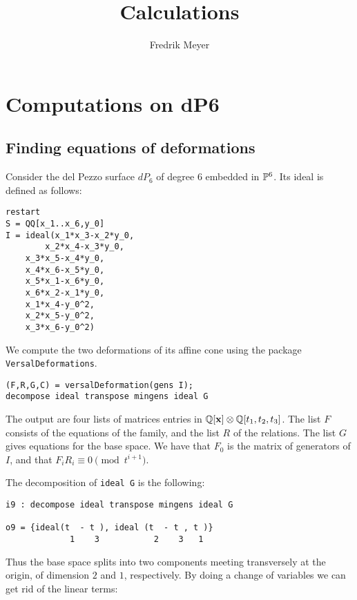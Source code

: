 \documentclass[11pt, english]{article}
\begin{document}
\title{Calculations}
\author{Fredrik Meyer}
\maketitle

\tableofcontents 

\section{Computations on dP6}
\subsection{Finding equations of deformations}

Consider the del Pezzo surface $dP_6$ of degree 6 embedded in $\mathbb{P}^6$. Its ideal is defined as follows:

\begin{lstlisting}
restart
S = QQ[x_1..x_6,y_0]
I = ideal(x_1*x_3-x_2*y_0,
    	x_2*x_4-x_3*y_0,
	x_3*x_5-x_4*y_0,
	x_4*x_6-x_5*y_0,
	x_5*x_1-x_6*y_0,
	x_6*x_2-x_1*y_0,
	x_1*x_4-y_0^2,
	x_2*x_5-y_0^2,
	x_3*x_6-y_0^2)
\end{lstlisting}

We compute the two deformations of its affine cone using the package \texttt{VersalDeformations}.

\begin{lstlisting}
(F,R,G,C) = versalDeformation(gens I);
decompose ideal transpose mingens ideal G
\end{lstlisting}

The output are four lists of matrices entries in $\mathbb{Q}[\mathbf x] \otimes \mathbb{Q}[t_1,t_2,t_3]$. The list $F$ consists of the equations of the family, and the list $R$ of the relations. The list $G$ gives equations for the base space. We have that $F_0$ is the matrix of generators of $I$, and that $F_i R_i \equiv 0 \pmod{t^{i+1}}$.

The decomposition of \texttt{ideal G} is the following:
\begin{lstlisting}
i9 : decompose ideal transpose mingens ideal G

o9 = {ideal(t  - t ), ideal (t  - t , t )}
             1    3           2    3   1

\end{lstlisting}

Thus the base space splits into two components meeting transversely at the origin, of dimension $2$ and $1$, respectively. By doing a change of variables we can get rid of the linear terms:
\end{document}
